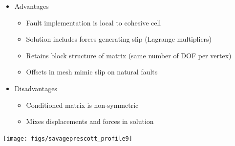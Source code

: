 \documentclass[pdftex,cig,slideColor]{pp4slides}
\begin{document}
 
 \begin{itemize}
 \item Advantages
   \begin{itemize}
   \item Fault implementation is local to cohesive cell
   \item Solution includes forces generating slip (Lagrange multipliers)
   \item Retains block structure of matrix (same number of DOF per vertex)
   \item Offsets in mesh mimic slip on natural faults
   \end{itemize}
 \item Disadvantages 
   \begin{itemize}
   \item Conditioned matrix is non-symmetric
   \item Mixes displacements and forces in solution
   \end{itemize}
 \end{itemize}
  

 

 

  \vfill
  \begin{center}
    \texttt{[image: figs/savageprescott\_profile9]}
  \end{center}
  
\end{document}
